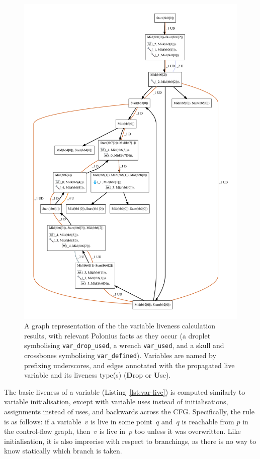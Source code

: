 \documentclass[11pt,a4paper,twoside,openany]{report}
\newcommand{\InDatalog}[1]{\texttt{#1}}
\begin{document}
\begin{figure}
  \includegraphics[width=0.9\linewidth]{Graphs/liveness.pdf}
  \caption[MIR Fragment with Inputs and Outputs of the Liveness Analysis]{A
    graph representation of the the variable liveness calculation results, with
    relevant Polonius facts as they occur (a droplet symbolising
    \InDatalog{var_drop_used}, a wrench \InDatalog{var_used}, and a skull and
    crossbones symbolising \InDatalog{var_defined}). Variables are named by
    prefixing underscores, and edges annotated with the propagated live variable
    and its liveness type(s) (\textbf{D}rop or \textbf{U}se).}
  \label{fig:liveness-graph}
\end{figure}

The basic liveness of a variable (Listing~\ref{lst:var-live}) is computed
similarly to variable initialisation, except with variable uses instead of
initialisations, assignments instead of uses, and backwards across the CFG.
Specifically, the rule is as follows: if a variable~$v$ is live in some
point~$q$ and~$q$ is reachable from $p$ in the control-flow graph, then~$v$ is
live in~$p$ too unless it was overwritten. Like initialisation, it is also
imprecise with respect to branchings, as there is no way to know statically
which branch is taken.
\end{document}
